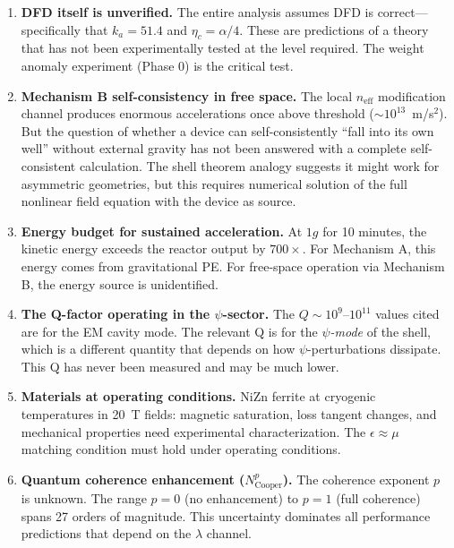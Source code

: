 \documentclass[12pt,aps,prd,superscriptaddress,nofootinbib,longbibliography]{revtex4-2}
\newcommand{\neff}{n_{\mathrm{eff}}}
\newcommand{\ka}{k_a}
\newcommand{\etac}{\eta_c}
\begin{document}
\begin{enumerate}
\item \textbf{DFD itself is unverified.}  The entire analysis assumes DFD
is correct---specifically that $\ka = 51.4$ and $\etac = \alpha/4$.
These are predictions of a theory that has not been experimentally tested
at the level required.  The weight anomaly experiment (Phase 0) is the
critical test.

\item \textbf{Mechanism B self-consistency in free space.}
The local $\neff$ modification channel produces enormous accelerations
once above threshold ($\sim 10^{13}$~m/s$^2$).  But the question of
whether a device can self-consistently ``fall into its own well'' without
external gravity has not been answered with a complete self-consistent
calculation.  The shell theorem analogy suggests it might work for
asymmetric geometries, but this requires numerical solution of the full
nonlinear field equation with the device as source.

\item \textbf{Energy budget for sustained acceleration.}
At $1g$ for 10 minutes, the kinetic energy exceeds the reactor output
by $700\times$.  For Mechanism A, this energy comes from gravitational PE.
For free-space operation via Mechanism B, the energy source is unidentified.

\item \textbf{The Q-factor operating in the $\psi$-sector.}
The $Q \sim 10^9$--$10^{11}$ values cited are for the EM cavity mode.
The relevant Q is for the \emph{$\psi$-mode} of the shell, which is
a different quantity that depends on how $\psi$-perturbations dissipate.
This Q has never been measured and may be much lower.

\item \textbf{Materials at operating conditions.}
NiZn ferrite at cryogenic temperatures in 20~T fields: magnetic saturation,
loss tangent changes, and mechanical properties need experimental
characterization.  The $\epsilon \approx \mu$ matching condition must
hold under operating conditions.

\item \textbf{Quantum coherence enhancement ($N_{\mathrm{Cooper}}^p$).}
The coherence exponent $p$ is unknown.  The range $p = 0$ (no enhancement)
to $p = 1$ (full coherence) spans 27 orders of magnitude.  This
uncertainty dominates all performance predictions that depend on the
$\lambda$ channel.
\end{enumerate}
\end{document}

